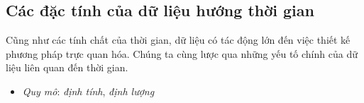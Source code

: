 \subsection{Các đặc tính của dữ liệu hướng thời gian}
Cũng như các tính chất của thời gian, dữ liệu có tác động lớn đến việc thiết kế phương pháp trực quan hóa. Chúng ta cùng lược qua những yếu tố chính của dữ liệu liên quan đến thời gian.
\begin{itemize}
    \item \textit{Quy mô}: \textit{định tính}, \textit{định lượng}
\end{itemize}